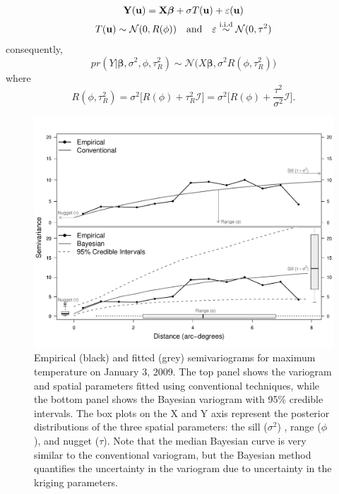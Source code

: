 \documentclass[12pt]{article}
\begin{document}
\begin{gather}
\mathbf{Y(u)}= \mathbf{X\boldsymbol{\beta}}+\sigma T({\bf
  u})+\varepsilon({\bf u})\\
T({\bf u})\sim\mathcal{N}(0,R(\phi)) 
\hspace{10pt} \text{and} 
\hspace{10pt} \varepsilon\stackrel{\mathrm{i.i.d}}{\sim}\mathcal{N}(0,\tau^2)
\end{gather}
consequently,
\begin{equation}
pr(Y|\boldsymbol{\beta},\sigma^2,\phi,\tau^2_R)\sim
\mathcal{N}\big(X\boldsymbol{\beta},\sigma^2R(\phi,\tau^2_R)\big)
\end{equation}
where
\begin{equation}
R(\phi,\tau^2_R)=\sigma^2\big[R(\phi)+\tau^2_R\mathcal{I}\big]=\sigma^2\Big[R(\phi)+\frac{\tau^2}{\sigma^2}\mathcal{I}\Big].
\end{equation}


\begin{figure}
  \begin{center}
 \includegraphics[width=\textwidth]{Figure1.pdf} \caption{Empirical
   (black) and fitted (grey) semivariograms for maximum temperature on
   January 3, 2009. The top panel shows the variogram and spatial
   parameters fitted using conventional techniques, while the bottom
   panel shows the Bayesian variogram with 95\% credible intervals. The box plots on the X and Y axis represent the
   posterior distributions of the three spatial parameters: the sill ($\sigma^2$) ,
range ($\phi$), and nugget ($\tau$).  Note that the median Bayesian
curve is very similar to the conventional variogram, but the Bayesian
method quantifies the uncertainty in the variogram due to uncertainty
in the kriging parameters.}
    \label{fig:kriging}
\end{center}
\end{figure}
\end{document}
